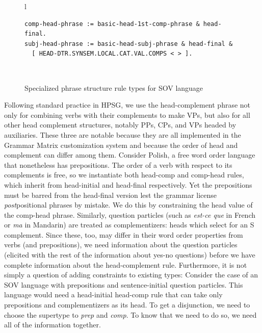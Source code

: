 \documentclass[11pt]{article}
\begin{document}
\begin{figure}[ht]
\small
\begin{center}
\begin{tabular}{l}
\begin{minipage}{5in}
\begin{verbatim}
comp-head-phrase := basic-head-1st-comp-phrase & head-final.
subj-head-phrase := basic-head-subj-phrase & head-final &
  [ HEAD-DTR.SYNSEM.LOCAL.CAT.VAL.COMPS < > ].
\end{verbatim}
\end{minipage}\\
\end{tabular}
\end{center}
\caption{Specialized phrase structure rule types for SOV language}
\label{tdlfig}
\end{figure}

Following standard practice in HPSG, we use the head-complement phrase
not only for combining verbs with their complements to make VPs, but
also for all other head complement structures, notably PPs, CPs, and
VPs headed by auxiliaries.  These three are notable because they are
all implemented in the Grammar Matrix customization system and
because the order of head and complement can differ among them.
Consider Polish, a free word order language that nonetheless has
prepositions.  The order of a verb with respect to its complements is
free, so we instantiate both head-comp and comp-head rules, which
inherit from head-initial and head-final respectively. Yet the
prepositions must be barred from the head-final version lest the
grammar license {\it post}positional phrases by mistake. We do this by
constraining the {\sc head} value of the comp-head phrase.  Similarly,
question particles (such as {\it est-ce que} in French or {\it ma} in
Mandarin) are treated as complementizers: heads which select for an S
complement.  Since these, too, may differ in their word order
properties from verbs (and prepositions), we need information about
the question particles (elicited with the rest of the information
about yes-no questions) before we have complete information about the
head-complement rule.  Furthermore, it is not simply a question of
adding constraints to existing types: Consider the case of an SOV
language with prepositions and sentence-initial question particles.
This language would need a head-initial head-comp rule that can take
only prepositions and complementizers as its head.  To get a
disjunction, we need to choose the supertype to {\it prep} and {\it
comp}.  To know that we need to do so, we need all of the information
together.
\end{document}
